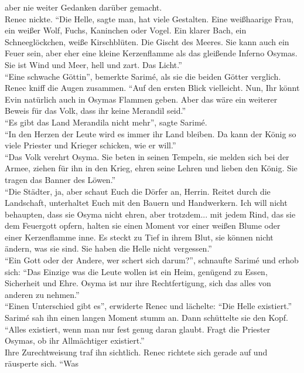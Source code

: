 aber nie weiter Gedanken darüber gemacht.\\
Renec nickte. ``Die Helle, sagte man, hat viele Gestalten. Eine weißhaarige Frau, ein weißer Wolf, 
Fuchs, Kaninchen oder Vogel. Ein klarer Bach, ein Schneeglöckchen, weiße Kirschblüten. Die Gischt 
des Meeres. Sie kann auch ein Feuer sein, aber eher eine kleine Kerzenflamme als das gleißende 
Inferno Osymas. Sie ist Wind und Meer, hell und zart. Das Licht.''\\
``Eine schwache Göttin'', bemerkte Sarimé, als sie die beiden Götter verglich. \\
Renec kniff die Augen zusammen. ``Auf den ersten Blick vielleicht. Nun, Ihr könnt Evin natürlich 
auch in Osymas Flammen geben. Aber das wäre ein weiterer Beweis für das Volk, dass ihr keine 
Merandil seid.''\\
``Es gibt das Land Merandila nicht mehr'', sagte Sarimé.\\
``In den Herzen der Leute wird es immer ihr Land bleiben. Da kann der König so viele Priester und 
Krieger schicken, wie er will.''\\
``Das Volk verehrt Osyma. Sie beten in seinen Tempeln, sie melden sich bei der Armee, ziehen für 
ihn in den Krieg, ehren seine Lehren und lieben den König. Sie tragen das Banner des Löwen.''\\
``Die Städter, ja, aber schaut Euch die Dörfer an, Herrin. Reitet durch die Landschaft, unterhaltet 
Euch mit den Bauern und Handwerkern. Ich will nicht behaupten, dass sie Osyma nicht ehren, aber 
trotzdem... mit jedem Rind, das sie dem Feuergott opfern, halten sie einen Moment vor einer weißen 
Blume oder einer Kerzenflamme inne. Es steckt zu Tief in ihrem Blut, sie können nicht ändern, was 
sie sind. Sie haben die Helle nicht vergessen.''\\
``Ein Gott oder der Andere, wer schert sich darum?'', schnaufte Sarimé und erhob sich: ``Das 
Einzige was die Leute wollen ist ein Heim, genügend zu Essen, Sicherheit und Ehre. Osyma ist nur 
ihre Rechtfertigung, sich das alles von anderen zu nehmen.''\\
``Einen Unterschied gibt es'', erwiderte Renec und lächelte: ``Die Helle existiert.''\\
Sarimé sah ihn einen langen Moment stumm an. Dann schüttelte sie den Kopf. ``Alles existiert, wenn 
man nur fest genug daran glaubt. Fragt die Priester Osymas, ob ihr Allmächtiger existiert.''\\
Ihre Zurechtweisung traf ihn sichtlich. Renec richtete sich gerade auf und räusperte sich. ``Was 
